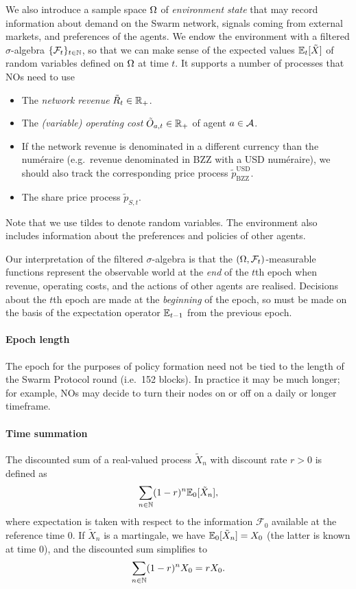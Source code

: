 We also introduce a sample space $\Omega$ of \emph{environment state} that may record information about demand on the Swarm network, signals coming from external markets, and preferences of the agents.
%
We endow the environment with a filtered $\sigma$-algebra $\{\mathcal{F}_t\}_{t\in\mathbb{N}}$, so that we can make sense of the expected values $\mathbb{E}_t[\tilde{X}]$ of random variables defined on $\Omega$ at time $t$.
%
It supports a number of processes that NOs need to use
\begin{itemize}
  \item The \emph{network revenue} $\tilde{R}_t\in \mathbb{R}_+$.
  \item The \emph{(variable) operating cost} $\tilde{O}_{a,t}\in\mathbb{R}_+$ of agent $a\in\mathcal{A}$.
  \item If the network revenue is denominated in a different currency than the num\'eraire (e.g.~revenue denominated in BZZ with a USD num\'eraire), we should also track the corresponding price process $\tilde p_\mathrm{BZZ}^\mathrm{USD}$.
  \item The share price process $\tilde{p}_{S,t}$.
\end{itemize}
Note that we use tildes to denote random variables.
%
The environment also includes information about the preferences and policies of other agents.

Our interpretation of the filtered $\sigma$-algebra is that the $(\Omega,\mathcal{F}_t)$-measurable functions represent the observable world at the \emph{end} of the $t$th epoch when revenue, operating costs, and the actions of other agents are realised.
%
Decisions about the $t$th epoch are made at the \emph{beginning} of the epoch, so must be made on the basis of the expectation operator $\mathbb{E}_{t-1}$ from the previous epoch.

\paragraph{Epoch length}
%
The epoch for the purposes of policy formation need not be tied to the length of the Swarm Protocol round (i.e.~152 blocks).
%
In practice it may be much longer; for example, NOs may decide to turn their nodes on or off on a daily or longer timeframe.

\paragraph{Time summation}
%
The discounted sum of a real-valued process $\tilde{X}_n$ with discount rate $r>0$ is defined as
\[
  \sum_{n\in\mathbb{N}}(1-r)^n\mathbb{E}_0[\tilde{X}_n],
\]
where expectation is taken with respect to the information $\mathcal{F}_0$ available at the reference time $0$.
%
If $\tilde{X}_n$ is a martingale, we have $\mathbb{E}_0[\tilde{X}_n]=X_0$ (the latter is known at time $0$), and the discounted sum simplifies to 
\[
  \sum_{n\in\mathbb{N}} (1-r)^n X_0 = rX_0.
\]

